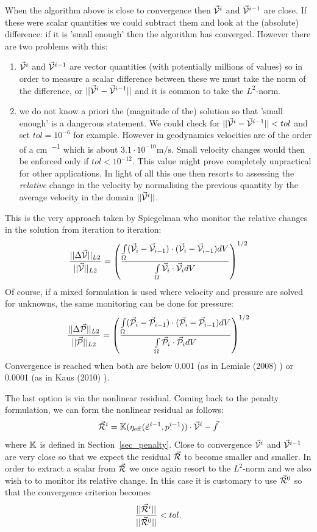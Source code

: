 When the algorithm above is close to convergence then $\vec{\cal V}^i$ and $\vec{\cal V}^{i-1}$ are close. 
If these were scalar quantities we could subtract them and look at the (absolute) difference: 
if it is 'small enough' then the algorithm has converged. 
However there are two problems with this: 
\begin{enumerate}
\item $\vec{\cal V}^i$ and $\vec{\cal V}^{i-1}$ are vector 
quantities (with potentially millions of values) so in order to measure a scalar difference 
between these we must take the norm of the difference, or $||\vec{\cal V}^i-\vec{\cal V}^{i-1}||$
and it is common to take the $L^2$-norm. 
\item we do not know a priori the (magnitude of the) solution so that 'small enough' is a dangerous 
statement. We could check for $||\vec{\cal V}^i-\vec{\cal V}^{i-1}||<tol$ and set $tol=10^{-6}$
for example. However in geodynamics velocities are of the order of a \si{\cm\per\year} which is 
about $3.1\cdot10^{-10}\si{\metre\per\second}$. Small velocity changes would then be enforced
only if $tol<10^{-12}$. This value might prove completely unpractical for other applications. 
In light of all this one then resorts to assessing the {\it relative} change in the velocity by normalising 
the previous quantity by the average velocity in the domain $||\vec{\cal V}^i||$.
\end{enumerate}

This is the very approach taken by Spiegelman \etal \cite{spmw16} who monitor the 
relative changes in the solution from iteration to iteration: 
\[
\frac{||\Delta \vec{\cal V} ||_{L2}}{||\vec{\cal V}||_{L2}} 
=
\left( \frac{\int\limits_\Omega (\vec{\cal V}_i-\vec{\cal V}_{i-1}) \cdot( \vec{\cal V}_i-\vec{\cal V}_{i-1}) dV}{\int\limits_\Omega \vec{\cal V}_i\cdot\vec{\cal V}_i dV} \right)^{1/2}
\]
Of course, if a mixed formulation is used where velocity and pressure are solved for unknowns,
the same monitoring can be done for pressure:
\[
\frac{||\Delta \vec{\cal P} ||_{L2}}{||\vec{\cal P}||_{L2}} 
=
\left( \frac{\int\limits_\Omega (\vec{\cal P}_i-\vec{\cal P}_{i-1}) \cdot( \vec{\cal P}_i-\vec{\cal P}_{i-1}) dV}{\int\limits_\Omega \vec{\cal P}_i\cdot\vec{\cal P}_i dV} \right)^{1/2}
\]
Convergence is reached when both are below 0.001 (as in Lemiale \etal (2008) \cite{lemm08}) 
or 0.0001 (as in Kaus \etal (2010) \cite{kaus10}).

The last option is via the nonlinear residual. Coming back to the penalty formulation, 
we can form the nonlinear residual as follows:
\[
\vec{\cal R}^i = {\mathbb{K}}(\eta_{\rm eff}(\dot{\bm\varepsilon}^{i-1},p^{i-1})) \cdot \vec{\cal V}^i - \vec{f}
\]
where ${\mathbb{K}}$ is defined in Section~\ref{sec_penalty}. 
Close to convergence $\vec{\cal V}^i$ and $\vec{\cal V}^{i-1}$
are very close so that we expect the residual $\vec{\cal R}$ to become smaller and smaller.
In order to extract a scalar from $\vec{\cal R}$ we once again resort to the $L^2$-norm and 
we also wish to to monitor its relative change. In this case it is customary to use $\vec{\cal R}^0$ so 
that the convergence criterion becomes
\[
\frac{||\vec{\cal R}^i ||}{||\vec{\cal R}^0 ||} < tol.
\]


